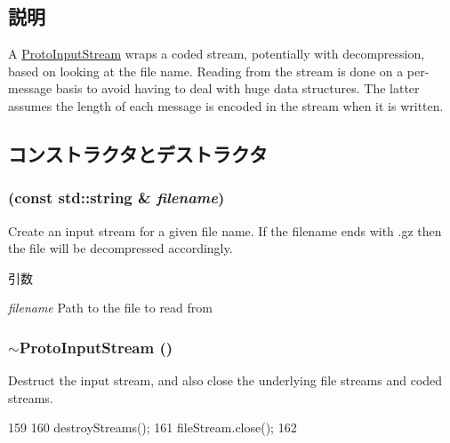 \subsection{説明}
A \hyperlink{classProtoInputStream}{ProtoInputStream} wraps a coded stream, potentially with decompression, based on looking at the file name. Reading from the stream is done on a per-\/message basis to avoid having to deal with huge data structures. The latter assumes the length of each message is encoded in the stream when it is written. 

\subsection{コンストラクタとデストラクタ}
\hypertarget{classProtoInputStream_a98d96d79c96828f28c14d812bd3b43a7}{
\subsubsection[{ProtoInputStream}]{ (const std::string \& {\em filename})}}
\label{classProtoInputStream_a98d96d79c96828f28c14d812bd3b43a7}
Create an input stream for a given file name. If the filename ends with .gz then the file will be decompressed accordingly.


\begin{DoxyParams}{引数}
\item[{\em filename}]Path to the file to read from \end{DoxyParams}
\hypertarget{classProtoInputStream_a26df47bdbd419ade481a0b13dbfca644}{
\subsubsection[{$\sim$ProtoInputStream}]{\setlength{\rightskip}{0pt plus 5cm}$\sim${\bf ProtoInputStream} ()}}
\label{classProtoInputStream_a26df47bdbd419ade481a0b13dbfca644}
Destruct the input stream, and also close the underlying file streams and coded streams. 


\begin{DoxyCode}
159 {
160     destroyStreams();
161     fileStream.close();
162 }
\end{DoxyCode}


